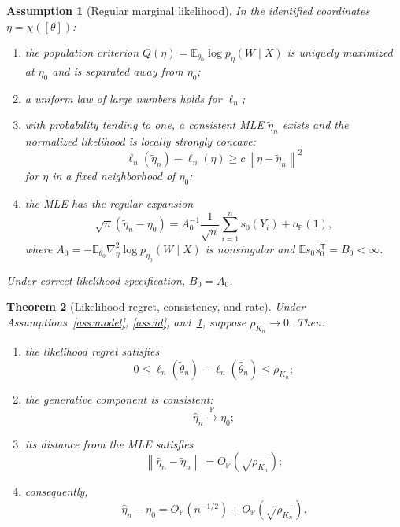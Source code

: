 \documentclass[11pt]{article}
\newtheorem{theorem}{Theorem}[section]
\newtheorem{assumption}[theorem]{Assumption}
\theoremstyle{definition}
\newcommand{\E}{\mathbb E}
\newcommand{\Pp}{\mathbb P}
\newcommand{\op}{o_{\Pp}}
\newcommand{\Op}{O_{\Pp}}
\newcommand{\trans}{\mathsf T}
\newcommand{\norm}[1]{\left\lVert #1\right\rVert}
\begin{document}
\begin{assumption}[Regular marginal likelihood]
\label{ass:likelihood}
In the identified coordinates $\eta=\chi([\theta])$:
\begin{enumerate}[label=(\roman*)]
\item the population criterion $Q(\eta)=\E_{\theta_0}\log p_\eta(W\mid X)$ is uniquely maximized at $\eta_0$ and is separated away from $\eta_0$;
\item a uniform law of large numbers holds for $\ell_n$;
\item with probability tending to one, a consistent MLE $\widetilde\eta_n$ exists and the normalized likelihood is locally strongly concave:
\[
\ell_n(\widetilde\eta_n)-\ell_n(\eta)
\ge c\norm{\eta-\widetilde\eta_n}^2
\]
for $\eta$ in a fixed neighborhood of $\eta_0$;
\item the MLE has the regular expansion
\begin{equation}
\sqrt n(\widetilde\eta_n-\eta_0)
=
A_0^{-1}\frac1{\sqrt n}\sum_{i=1}^n s_0(Y_i)+\op(1),
\label{eq:mle-expansion}
\end{equation}
where $A_0=-\E_{\theta_0}\nabla_\eta^2\log p_{\eta_0}(W\mid X)$ is nonsingular and $\E s_0s_0^{\trans}=B_0<\infty$.
\end{enumerate}
Under correct likelihood specification, $B_0=A_0$.
\end{assumption}

\begin{theorem}[Likelihood regret, consistency, and rate]
\label{thm:main-rate}
Under Assumptions~\ref{ass:model}, \ref{ass:id}, and~\ref{ass:likelihood}, suppose $\rho_{K_n}\to0$. Then:
\begin{enumerate}[label=(\roman*)]
\item the likelihood regret satisfies
\begin{equation}
0\le
\ell_n(\widetilde\theta_n)-\ell_n(\widehat\theta_n)
\le \rho_{K_n};
\label{eq:likelihood-regret}
\end{equation}
\item the generative component is consistent:
\[
\widehat\eta_n\xrightarrow{\Pp}\eta_0;
\]
\item its distance from the MLE satisfies
\begin{equation}
\norm{\widehat\eta_n-\widetilde\eta_n}
=
\Op\!\left(\sqrt{\rho_{K_n}}\right);
\label{eq:mle-distance}
\end{equation}
\item consequently,
\begin{equation}
\widehat\eta_n-\eta_0
=
\Op(n^{-1/2})
+
\Op\!\left(\sqrt{\rho_{K_n}}\right).
\label{eq:total-rate}
\end{equation}
\end{enumerate}
\end{theorem}
\end{document}
